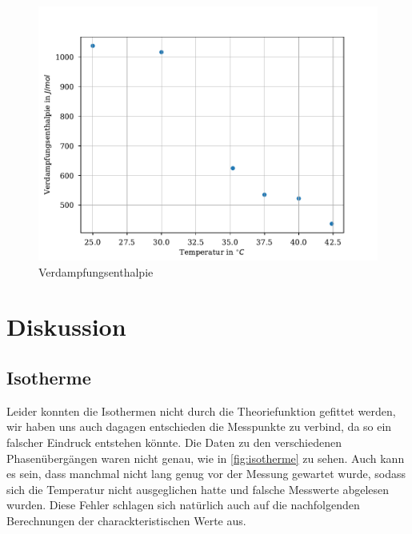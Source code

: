 \documentclass[11pt, a4paper]{article}
\begin{document}
    \begin{figure}
        \centering
        \includegraphics[width=\textwidth]{./Plots/verd.pdf}

        \caption{Verdampfungsenthalpie}
        \label{fig:verd}
    \end{figure}
    \section{Diskussion}
    \subsection{Isotherme}
    Leider konnten die Isothermen nicht durch die Theoriefunktion gefittet werden, wir haben uns auch dagagen entschieden die 
    Messpunkte zu verbind, da so ein falscher Eindruck entstehen könnte. Die Daten zu den verschiedenen Phasenübergängen waren 
    nicht genau, wie in \ref{fig:isotherme} zu sehen. Auch kann es sein, dass manchmal nicht lang genug vor der 
    Messung gewartet wurde, sodass sich die Temperatur nicht ausgeglichen hatte und falsche Messwerte abgelesen wurden.
    Diese Fehler schlagen sich natürlich auch auf die nachfolgenden Berechnungen der charackteristischen Werte aus.
\end{document}
